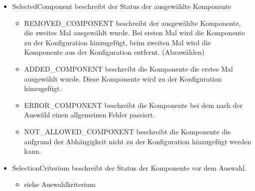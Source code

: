\documentclass{article}
\begin{document}
\begin{itemize}
  \item SelectedComponent beschreibt der Status der ausgew\"ahlte Komponente
  \begin{itemize}
    \item REMOVED\_COMPONENT beschreibt der ausgew\"ahlte Komponente, die
    zweites Mal ausgew\"ahlt wurde. Bei ersten Mal wird die Komponente zu der
    Konfiguration hinzugef\"ugt, beim zweiten Mal wird die Komponente aus der
    Konfiguration entfernt. (Abzuw\"ahlen)
    \item ADDED\_COMPONENT beschreibt die Komponente die erstes Mal ausgew\"ahlt
    wurde. Diese Komponente wird zu der Konfiguration hinzugefügt.
    \item ERROR\_COMPONENT beschreibt die Komponente bei dem nach der Ausw\"ahl
    einen allgemeinen Fehler passiert.
    \item NOT_ALLOWED_COMPONENT beschreibt die Komponente die aufgrund der
    Abh\"angigkeit nicht zu der Konfiguration hinzugef\"ugt werden kann.
  \end{itemize}
  \item SelectionCriterium beschreibt der Status der Komponente vor dem Auswahl.
  \begin{itemize}
    \item siehe Auswahlkriterium
  \end{itemize}
\end{itemize}
\end{document}
